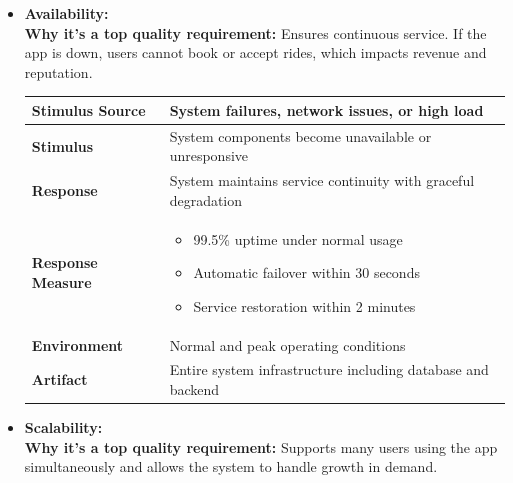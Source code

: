 \documentclass[12pt]{article}
\begin{document}
\begin{itemize}
  \item \textbf{Availability:} \\
  \textbf{Why it's a top quality requirement:} Ensures continuous service. If the app is down, users cannot book or accept rides, which impacts revenue and reputation. \\

\begin{table}[h]
\centering
\begin{tabular}{|l|p{10cm}|}
\hline
\textbf{Stimulus Source} & System failures, network issues, or high load \\
\hline
\textbf{Stimulus} & System components become unavailable or unresponsive \\
\hline
\textbf{Response} & System maintains service continuity with graceful degradation \\
\hline
\textbf{Response Measure} & 
\begin{itemize}
  \item 99.5\% uptime under normal usage
  \item Automatic failover within 30 seconds
  \item Service restoration within 2 minutes
\end{itemize} \\
\hline
\textbf{Environment} & Normal and peak operating conditions \\
\hline
\textbf{Artifact} & Entire system infrastructure including database and backend \\
\hline
\end{tabular}
\end{table}
  
  \item \textbf{Scalability:} \\
  \textbf{Why it's a top quality requirement:} Supports many users using the app simultaneously and allows the system to handle growth in demand. \\


\end{itemize}
\end{document}
